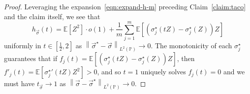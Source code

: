 \documentclass[10pt,a4paper]{amsart}
\theoremstyle{plain}
\newcommand{\E}{\mathbb{E}}
\newcommand{\Prb}{\mathbb{P}}
\newcommand{\norm}[1]{\left\|{#1}\right\|}
\newcommand{\LtwoP}[1]{\norm{#1}_{L^2(\Prb)}}
\newcommand{\half}{\frac{1}{2}}
\newcommand{\opt}{^\star}
\begin{document}
\begin{proof}
	Leveraging the expansion~\eqref{eqn:expand-h-m} preceding
	Claim~\ref{claim:taco} and the claim itself, we see that
	\begin{equation*}
		h_{\vec{\sigma}}(t) = \E[Z^2] \cdot o(1) +
		\frac{1}{m} \sum_{j = 1}^m
		\E[(\sigma_j\opt(tZ) - \sigma_j\opt(Z))Z]
	\end{equation*}
	uniformly in $t \in [\half, 2]$ as $\LtwoP{\vec{\sigma}\opt -
		\vec{\sigma}} \to 0$. The monotonicity of each $\sigma_j\opt$ guarantees
	that if $f_j(t) = \E[(\sigma_j\opt(tZ) - \sigma_j\opt(Z))Z]$, then
	$f'_j(t) = \E[{\sigma_j\opt}'(tZ) Z^2] > 0$, and so $t = 1$ uniquely
	solves $f_j(t) = 0$ and we must have $t_{\vec{\sigma}} \to 1$ as
	$\LtwoP{\vec{\sigma} - \vec{\sigma}\opt} \to 0$.
\end{proof}
\end{document}
